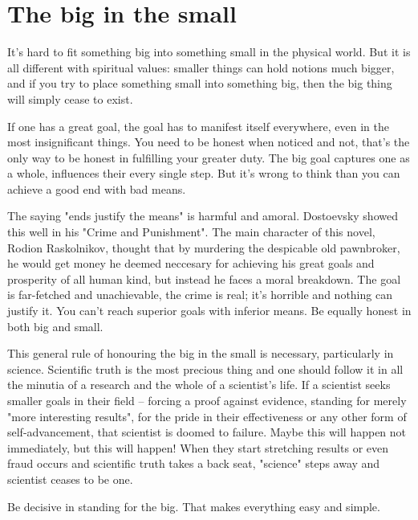 \chapter{The big in the small}

It's hard to fit something big into something small in the physical world. But it is all different with spiritual values: smaller things can hold notions much bigger, and if you try to place something small into something big, then the big thing will simply cease to exist.

If one has a great goal, the goal has to manifest itself everywhere, even in the most insignificant things. You need to be honest when noticed and not, that's the only way to be honest in fulfilling your greater duty. The big goal captures one as a whole, influences their every single step. But it's wrong to think than you can achieve a good end with bad means.

The saying "ends justify the means" is harmful and amoral. Dostoevsky showed this well in his "Crime and Punishment". The main character of this novel, Rodion Raskolnikov, thought that by murdering the despicable old pawnbroker, he would get money he deemed neccesary for achieving his great goals and prosperity of all human kind, but instead he faces a moral breakdown. The goal is far-fetched and unachievable, the crime is real; it's horrible and nothing can justify it. You can't reach superior goals with inferior means. Be equally honest in both big and small. 

This general rule of honouring the big in the small is necessary, particularly in science. Scientific truth is the most precious thing and one should follow it in all the minutia of a research and the whole of a scientist's life. If a scientist seeks smaller goals in their field -- forcing a proof against evidence, standing for merely "more interesting results", for the pride in their effectiveness or any other form of self-advancement, that scientist is doomed to failure. Maybe this will happen not immediately, but this will happen! When they start stretching results or even fraud occurs and scientific truth takes a back seat, "science" steps away and scientist ceases to be one.

Be decisive in standing for the big. That makes everything easy and simple.
